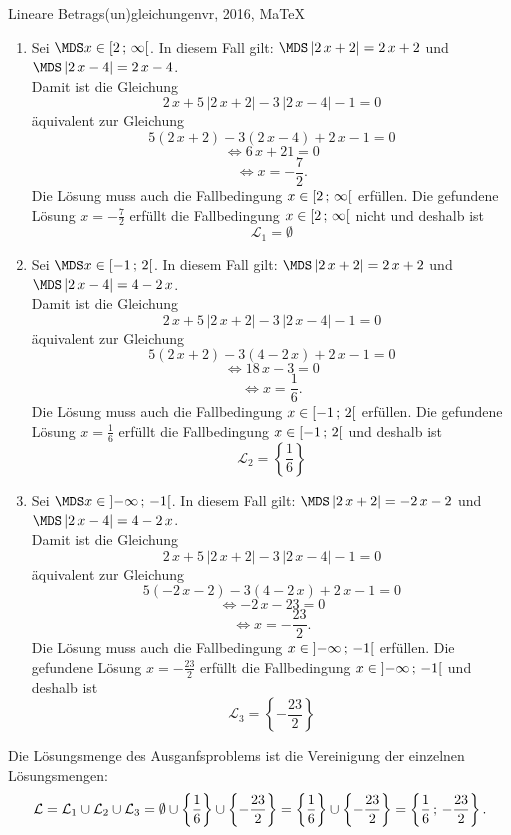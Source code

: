 \begin{MAufgabe}{Lineare Betrags(un)gleichungen}{vr, 2016, MaTeX}
 \begin{enumerate} 
 \item Sei $ \MDS x\in[ 2 \, \MIntvlSep \, \infty\MoIr $. 
 In diesem Fall gilt: 
  $ \MDS \left| 2\, x + 2\right|=2\, x + 2$ und $ \MDS \left| 2\, x - 4\right|=2\, x - 4$. \\ 
 Damit ist die Gleichung 
 $$ 
2\, x + 5\, \left|2\, x + 2\right| - 3\, \left|2\, x - 4\right| - 1= 0
$$
 \"aquivalent zur Gleichung
 $$ 
5\left(2\, x + 2\right)-3\left( 2\, x - 4\right)+2\, x-1= 0 
$$  
$$ 
 \Leftrightarrow 6\, x + 21= 0 
$$  
$$ \Leftrightarrow x = - \frac{7}{2} . 
 $$ 
 Die L\"osung muss auch die Fallbedingung $x\in [ 2 \, ; \, \infty[\mbox{}  $ erf\"ullen. Die gefundene L\"osung $x=- \frac{7}{2}$ erf\"ullt die Fallbedingung  $x\in [ 2 \, ; \, \infty[\mbox{} $ nicht und deshalb ist  $$
 \mathcal{L}_{1}=\emptyset 
 $$ 
\item Sei $ \MDS x\in[ -1 \, \MIntvlSep \, 2\MoIr $. 
 In diesem Fall gilt: 
  $ \MDS \left| 2\, x + 2\right|=2\, x + 2$ und $ \MDS \left| 2\, x - 4\right|=4 - 2\, x$. \\ 
 Damit ist die Gleichung 
 $$ 
2\, x + 5\, \left|2\, x + 2\right| - 3\, \left|2\, x - 4\right| - 1= 0
$$
 \"aquivalent zur Gleichung
 $$ 
5\left(2\, x + 2\right)-3\left( 4 - 2\, x\right)+2\, x-1= 0 
$$  
$$ 
 \Leftrightarrow 18\, x - 3= 0 
$$  
$$ \Leftrightarrow x = \frac{1}{6} . 
 $$ 
 Die L\"osung muss auch die Fallbedingung $x\in [ -1 \, ; \, 2[\mbox{}  $ erf\"ullen. Die gefundene L\"osung $x=\frac{1}{6}$ erf\"ullt die Fallbedingung  $x\in [ -1 \, ; \, 2[\mbox{} $ und deshalb ist  $$
 \mathcal{L}_{2}=\left\{\frac{1}{6}\right\}
 $$ 
\item Sei $ \MDS x\in\MoIl  -\infty \, \MIntvlSep \, -1\MoIr $. 
 In diesem Fall gilt: 
  $ \MDS \left| 2\, x + 2\right|= - 2\, x - 2$ und $ \MDS \left| 2\, x - 4\right|=4 - 2\, x$. \\ 
 Damit ist die Gleichung 
 $$ 
2\, x + 5\, \left|2\, x + 2\right| - 3\, \left|2\, x - 4\right| - 1= 0
$$
 \"aquivalent zur Gleichung
 $$ 
5\left( - 2\, x - 2\right)-3\left( 4 - 2\, x\right)+2\, x-1= 0 
$$  
$$ 
 \Leftrightarrow  - 2\, x - 23= 0 
$$  
$$ \Leftrightarrow x = - \frac{23}{2} . 
 $$ 
 Die L\"osung muss auch die Fallbedingung $x\in \mbox{}]\mathopen{}  -\infty \, ; \, -1[\mbox{}  $ erf\"ullen. Die gefundene L\"osung $x=- \frac{23}{2}$ erf\"ullt die Fallbedingung  $x\in \mbox{}]\mathopen{}  -\infty \, ; \, -1[\mbox{} $ und deshalb ist  $$
 \mathcal{L}_{3}=\left\{- \frac{23}{2}\right\}
 $$ 
 \end{enumerate} 
  Die L\"osungsmenge des Ausganfsproblems ist die Vereinigung der einzelnen L\"osungsmengen: 
$$ \mathcal{L} = \mathcal{L}_{1} \cup \mathcal{L}_{2} \cup \mathcal{L}_{3} 
 = \emptyset\cup \left\{\frac{1}{6}\right\}\cup \left\{- \frac{23}{2}\right\} 
  =\left\{\frac{1}{6}\right\}\cup\left\{- \frac{23}{2}\right\} 
  = \left\{\frac{1}{6}\, ; \,- \frac{23}{2}\right\} 
 . $$ 
 

\end{MAufgabe}
